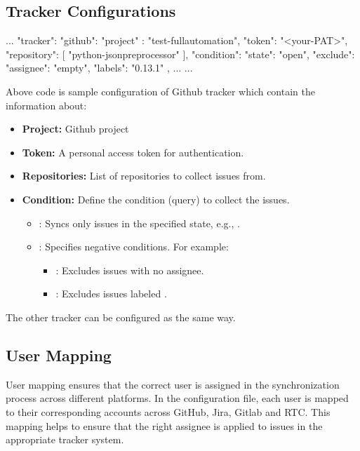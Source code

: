 \subsection{Tracker Configurations}
\begin{pythoncode}
{
   ...
   "tracker": {
      "github": {
         "project" : "test-fullautomation",
         "token": "<your-PAT>",
         "repository": [
            "python-jsonpreprocessor"
         ],
         "condition": {
            "state": "open",
            "exclude": {
               "assignee": "empty",
               "labels": "0.13.1"
            }
         }
      },
      ...
   }
   ... 
}
\end{pythoncode}

Above code is sample configuration of Github tracker which contain the 
information about:

\begin{itemize}
    \item \textbf{Project:} Github project 
    \item \textbf{Token:} A personal access token for authentication.
    \item \textbf{Repositories:} List of repositories to collect issues from.
    \item \textbf{Condition:} Define the condition (query) to collect the issues.
          \begin{itemize}
            \item {}: Syncs only issues in the specified state, 
                  e.g., .
            \item {}: Specifies negative conditions. For example:
            \begin{itemize}
               \item {}: Excludes issues with no assignee.
               \item {}: Excludes issues labeled .
            \end{itemize}
          \end{itemize}
\end{itemize}

The other tracker can be configured as the same way.

\subsection{User Mapping}
User mapping ensures that the correct user is assigned in the synchronization 
process across different platforms. 
In the configuration file, each user is mapped to their corresponding accounts 
across GitHub, Jira, Gitlab and RTC. This mapping helps to ensure that the right 
assignee is applied to issues in the appropriate tracker system.

